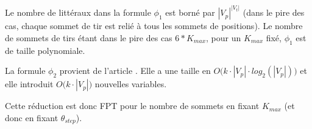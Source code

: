 Le nombre de littéraux dans la formule $\phi_1$ est borné par $|V_p| ^{|V_t|}$  (dans le pire des cas, chaque sommet de tir est relié à tous les sommets de positions). Le nombre de sommets de tirs étant dans le pire des cas $6*K_{max}$, pour un $K_{max}$ fixé, $\phi_1$ est de taille polynomiale.

La formule $\phi_2$ provient de l'article \cite{FG10}. Elle a une taille en $O\Big(k\cdot |V_p| \cdot log_2(|V_p|)\Big)$ et elle introduit  $O\Big(k \cdot |V_p| \Big)$ nouvelles variables.

Cette réduction est donc FPT pour le nombre de sommets en fixant $K_{max}$ (et donc en fixant $\theta_{step}$).